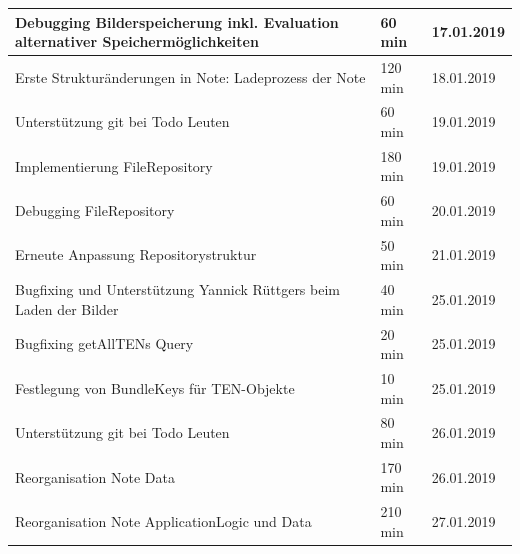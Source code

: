 \begin{longtable}{|p{10cm}|p{2cm}|p{2cm}|}
		Debugging Bilderspeicherung inkl. Evaluation alternativer Speichermöglichkeiten          & 60 min                                & 17.01.2019                            \\ \hline
		Erste Strukturänderungen in Note: Ladeprozess der Note                                   & 120 min                               & 18.01.2019                            \\ \hline
		Unterstützung git bei Todo Leuten                                                        & 60 min                                & 19.01.2019                            \\ \hline
		Implementierung FileRepository                                                           & 180 min                               & 19.01.2019                            \\ \hline
		Debugging FileRepository                                                                 & 60 min                                & 20.01.2019                            \\ \hline
		Erneute Anpassung Repositorystruktur                                                     & 50 min                                & 21.01.2019                            \\ \hline
		Bugfixing und Unterstützung Yannick Rüttgers beim Laden der Bilder                       & 40 min                                & 25.01.2019                            \\ \hline
		Bugfixing getAllTENs Query                                                               & 20 min                                & 25.01.2019                            \\ \hline
		Festlegung von BundleKeys für TEN-Objekte                                                & 10 min                                & 25.01.2019                            \\ \hline
		Unterstützung git bei Todo Leuten                                                        & 80 min                                & 26.01.2019                            \\ \hline
		Reorganisation Note Data                                                                 & 170 min                               & 26.01.2019                            \\ \hline
		Reorganisation Note ApplicationLogic und Data                                            & 210 min                               & 27.01.2019                            \\ \hline

\end{longtable}
